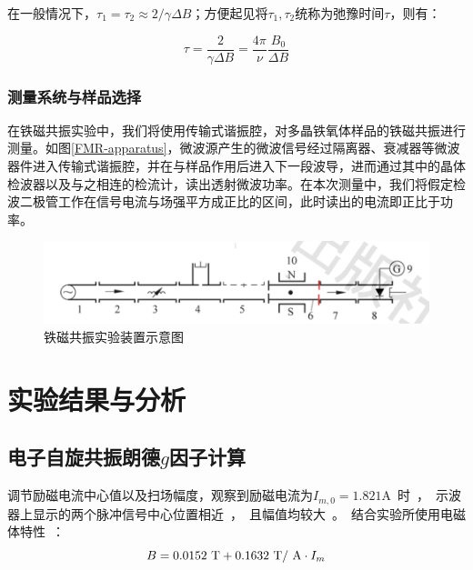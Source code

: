 \documentclass{thuemp}
\begin{document}
    在一般情况下，$\tau_1 = \tau_2 \approx 2/\gamma \Delta B$；方便起见将$\tau_1, \tau_2$统称为弛豫时间$\tau$，则有：
    
    \begin{equation}
        \tau = \frac{2}{\gamma\Delta B} = \frac{4\pi}{\nu}\frac{B_0}{\Delta B}
    \end{equation}
    
    
    
    \subsubsection{测量系统与样品选择}
    
    在铁磁共振实验中，我们将使用传输式谐振腔，对多晶铁氧体样品的铁磁共振进行测量。如图\ref{FMR-apparatus}，微波源产生的微波信号经过隔离器、衰减器等微波器件进入传输式谐振腔，并在与样品作用后进入下一段波导，进而通过其中的晶体检波器以及与之相连的检流计，读出透射微波功率。在本次测量中，我们将假定检波二极管工作在信号电流与场强平方成正比的区间，此时读出的电流即正比于功率。
    
    \begin{figure}[H]
        \centering
        \includegraphics[width=0.8\linewidth]{./FMR-apparatus.png}
        \caption{铁磁共振实验装置示意图} \label{fig:FMR-apparatus}
    \end{figure}
    
    \section{实验结果与分析}
    
    \subsection{电子自旋共振朗德$g$因子计算}
    
    调节励磁电流中心值以及扫场幅度，观察到励磁电流为$I_{m,0} = 1.821$\si\ampere 时，示波器上显示的两个脉冲信号中心位置相近，且幅值均较大。结合实验所使用电磁体特性：
    
    \begin{equation}
        B = 0.0152 ~\text{\si\tesla} + 0.1632 ~\text{\si\tesla / \si\ampere} \cdot I_m
    \end{equation}
    
\end{document}

